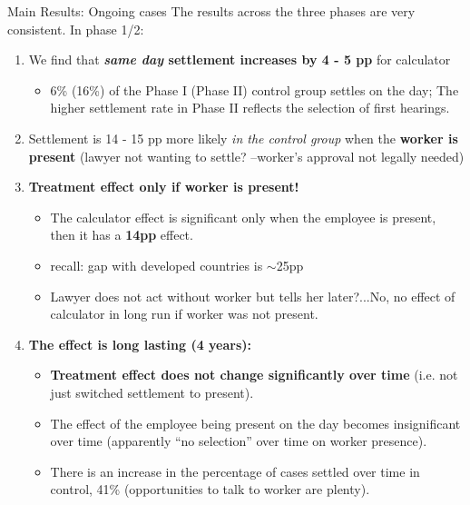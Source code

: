 \documentclass[9pt]{beamer}
\begin{document}
\begin{frame}{Main Results: Ongoing cases}
\label{frame_Main_Results}
The results across the three phases are very consistent. In phase 1/2:
\vspace{.1in}
    \begin{enumerate}
        \item We find that \textbf{\textit{same day} settlement increases by 4 - 5 pp} for calculator 
        \begin{itemize}
            \item 6\% (16\%) of the Phase I (Phase II) control group settles on the day; The higher settlement rate in Phase II reflects the selection of first hearings.
               	\hyperlink{frame_Table3A}{}
               	 \end{itemize}
        \vspace{1mm}
    \pause
    \label{frame_Main_Resultsb}
        \item Settlement is 14 - 15 pp more likely \textit{in the control group} when the \textbf{worker is present} (lawyer not wanting to settle? --worker's approval not legally needed)
         \pause
         \vspace{2mm}
        \item \textbf{Treatment effect only if worker is present!}
        \pause
            \begin{itemize}
                \item The calculator effect is significant only when the employee is present, then it has a \textbf{14pp} effect. 
        	\hyperlink{frame_Table3B}{}
        	    \item recall: gap with developed countries is $\sim$25pp
        	    \pause
        	    \item Lawyer does not act without worker but tells her later?...No, no effect of calculator in long run if worker was not present.
            \end{itemize}
        \pause
        \vspace{2mm}
          \label{frame_Main_Resultsc}
            \item \textbf{The effect is long lasting (4 years):}  
            \pause
         \begin{itemize}
         \vspace{1mm}
             \item  \textbf{Treatment effect does not change significantly over time} (i.e. not just switched settlement to present).
             \vspace{1mm}
             \pause
             \item The effect of the employee being present on the day becomes insignificant over time (apparently ``no selection'' over time on worker presence). 
             \pause
             \item There is an increase in the percentage of cases settled over time in control, 41\% (opportunities to talk to worker are plenty).
             

\end{itemize}
\end{enumerate}
\end{frame}
\end{document}
